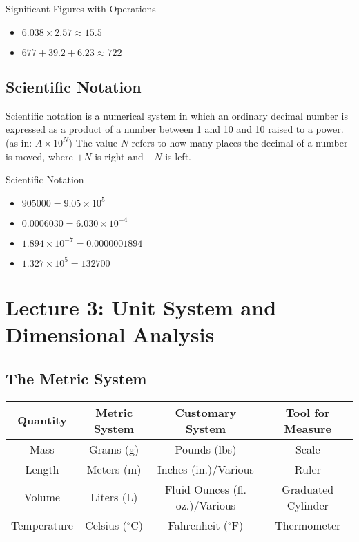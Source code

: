 \begin{example}
Significant Figures with Operations
\begin{itemize}
	\item $6.038 \times 2.57 \approx 15.5$
	\item $677 + 39.2 + 6.23 \approx 722$
\end{itemize}
\end{example}

\subsection{Scientific Notation}
\begin{defn}
Scientific notation is a numerical system in which an ordinary decimal number is expressed as a product of a number between 1 and 10 and 10 raised to a power. (as in: $A \times 10^{N}$) The value $N$ refers to how many places the decimal of a number is moved, where $+N$ is right and $-N$ is left.
\end{defn}

\begin{example}
Scientific Notation
\begin{itemize}
\item $905000 = 9.05 \times 10^{5}$
\item $0.0006030 = 6.030 \times 10^{-4}$ \\ 
\item $1.894 \times 10^{-7} =0.0000001894$
\item $1.327 \times 10^{5} = 132700$
\end{itemize}
\end{example}

\section{Lecture 3: Unit System and Dimensional Analysis}

\subsection{The Metric System}
\begin{table}[H]
\centering
\begin{tabular}{|c|c|c|c|}
\hline
Quantity & Metric System & Customary System & Tool for Measure \\
\hline
Mass & Grams (g) & Pounds (lbs) & Scale \\
\hline
Length & Meters (m) & Inches (in.)/Various & Ruler \\
\hline
Volume & Liters (L) & Fluid Ounces (fl. oz.)/Various & Graduated Cylinder \\
\hline
Temperature & Celsius ($^\circ$C) & Fahrenheit ($^\circ$F) & Thermometer \\
\hline
\end{tabular}
\end{table}

